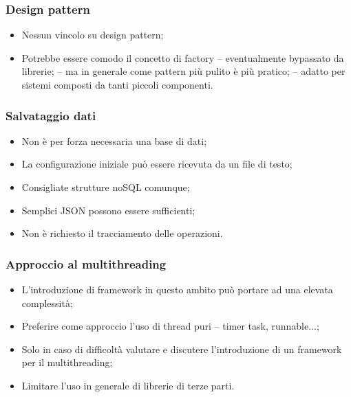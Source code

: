     \subsubsection{Design pattern}
        \begin{itemize}
            \item Nessun vincolo su design pattern;
            \item Potrebbe essere comodo il concetto di factory
                \subitem -- eventualmente bypassato da librerie;
                \subitem -- ma in generale come pattern più pulito è più pratico;
                \subitem -- adatto per sistemi composti da tanti piccoli componenti.
        \end{itemize}

    \subsubsection{Salvataggio dati}
        \begin{itemize}
            \item Non è per forza necessaria una base di dati;
            \item La configurazione iniziale può essere ricevuta da un file di testo;
            \item Consigliate strutture noSQL comunque;
            \item Semplici JSON possono essere sufficienti;
            \item Non è richiesto il tracciamento delle operazioni.
        \end{itemize}

    \subsubsection{Approccio al multithreading}
        \begin{itemize}
            \item L'introduzione di framework in questo ambito può portare ad una elevata complessità;
            \item Preferire come approccio l'uso di thread puri
                \subitem -- timer task, runnable...;
            \item Solo in caso di difficoltà valutare e discutere l'introduzione di un framework per il multithreading;
            \item Limitare l'uso in generale di librerie di terze parti.
        \end{itemize}

